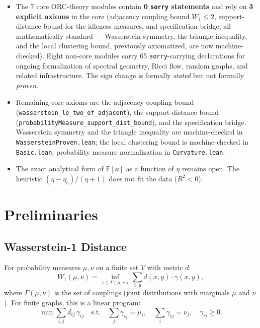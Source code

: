 \documentclass[12pt]{article}
\newcommand{\etac}{\eta_c}
\newcommand{\Wone}{W_1}
\newcommand{\sorry}{\texttt{sorry}}
\begin{document}
\begin{itemize}
  \item The 7 core ORC-theory modules contain \textbf{0 \sorry{} statements} and rely on
  \textbf{3 explicit axioms} in the core (adjacency coupling bound $W_1 \leq 2$,
  support-distance bound for the idleness measures, and specification bridge; all
  mathematically standard --- Wasserstein symmetry, the triangle inequality, and the local
  clustering bound, previously axiomatized, are now machine-checked). Eight non-core
  modules carry 65 \sorry{}-carrying declarations for ongoing formalization of spectral
  geometry, Ricci flow, random graphs, and related infrastructure.
  The sign change is formally \emph{stated} but not formally \emph{proven}.

  \item Remaining core axioms are the adjacency coupling bound
  (\texttt{wasserstein\_le\_two\_of\_adjacent}), the support-distance bound
  (\texttt{probabilityMeasure\_support\_dist\_bound}), and the specification bridge.
  Wasserstein symmetry and the triangle inequality are machine-checked in
  \texttt{WassersteinProven.lean}; the local clustering bound is machine-checked in
  \texttt{Basic.lean}; probability measure normalization in \texttt{Curvature.lean}.

  \item The exact analytical form of $\mathbb{E}[\kappa]$ as a function of $\eta$ remains
  open. The heuristic $(\eta - \etac)/(\eta + 1)$ does not fit the data ($R^2 < 0$).
\end{itemize}

\section{Preliminaries}
\label{sec:prelim}

\subsection{Wasserstein-1 Distance}

For probability measures $\mu, \nu$ on a finite set $V$ with metric $d$:
\begin{equation}
  \Wone(\mu, \nu) = \inf_{\gamma \in \Gamma(\mu, \nu)}
  \sum_{x,y} d(x,y)\cdot\gamma(x,y),
  \label{eq:wasserstein}
\end{equation}
where $\Gamma(\mu,\nu)$ is the set of couplings (joint distributions with marginals $\mu$
and $\nu$). For finite graphs, this is a linear program:
\begin{equation}
  \min \sum_{i,j} d_{ij}\,\gamma_{ij} \quad \text{s.t.} \quad
  \sum_j \gamma_{ij} = \mu_i,\quad \sum_i \gamma_{ij} = \nu_j,\quad \gamma_{ij} \geq 0.
  \label{eq:lp}
\end{equation}
\end{document}
